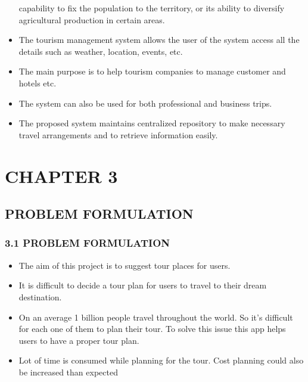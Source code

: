 \documentclass[12pt,a4paper]{article}
\begin{document}
\begin{itemize}
		capability to fix the population to the territory, or its ability to diversify agricultural
		production in certain areas.
		\item The tourism management system allows the user of the system access all the details
		such as weather, location, events, etc.
		\item The main purpose is to help tourism companies to manage customer and hotels etc.
		\item The system can also be used for both professional and business trips.
		\item The proposed system maintains centralized repository to make necessary travel
		arrangements and to retrieve information easily.
		
	\end{itemize}
	\newpage

\section*{CHAPTER 3}
\subsection*{\protect \centering PROBLEM FORMULATION}
\pagestyle{fancy}
\pagestyle{myPageStyle}

\subsubsection*{3.1 PROBLEM FORMULATION}
	\begin{itemize}
	\item The aim of this project is to suggest tour places for users.
	\item It is difficult to decide a tour plan for users to travel to their dream destination.
	\item On an average 1 billion people travel throughout the world. So it's difficult for each one
	of them to plan their tour. To solve this issue this app helps users to have a proper tour
	plan.
	\item Lot of time is consumed while planning for the tour. Cost planning could also be
	increased than expected
	\end{itemize}
\end{document}
